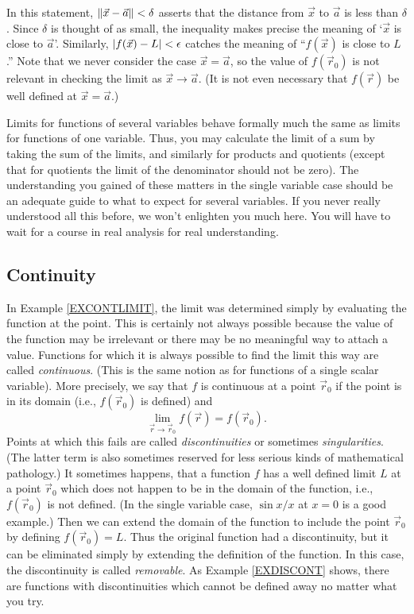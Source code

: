 In this statement, $\lVert\vec x - \vec a\rVert < \delta$ asserts that the distance
from $\vec x$ to $\vec a$ is less than $\delta$.  Since $\delta$ is
thought of as small, the inequality  makes precise the meaning of
`$\vec x$ is close to $\vec a$'.   Similarly, $\lvert f(\vec x) - L\rvert < 
\epsilon$ catches the meaning of ``$f(\vec x)$ is close to 
$L$.''  Note that we never consider the case $\vec x = \vec a$,
so the value of $f(\vec r_0)$
 is not relevant in checking the limit as $\vec x \to \vec a$.
(It is not even necessary that $f(\vec r)$  be well defined at
$\vec x = \vec a$.)

Limits for functions of several variables behave formally much
the same as limits for functions of one variable.  Thus, you
may calculate the limit of a sum by taking the sum of the
limits, and similarly for products and quotients (except that
for quotients the limit of the denominator should not be zero).
The understanding you gained of these matters in the single
variable case should be an adequate guide to what to expect
for several variables.  If you never really understood all this
before, we won't enlighten you much here.  You will have to
wait for a course in real analysis for real understanding.

\subsection{Continuity}
In Example \ref{EXCONTLIMIT}, the limit was determined simply by evaluating the
function at the point.  This is certainly not always possible
because the value of the function may be irrelevant or there
may be no 
meaningful 
way to 
attach a value.   Functions
for which it is always possible to find the limit this way
 are called
\emph{continuous}.  (This is the same notion as for functions
of a single scalar variable).  More precisely, we say that
$f$ is continuous at a point $\vec r_0$ if the point is in its domain (i.e.,
$f(\vec r_0)$ is defined) and
\[
  \lim_{\vec r \to \vec r_0} f(\vec r) = f(\vec r_0).
\]
Points at which this fails  are called \emph{discontinuities}
or sometimes \emph{singularities}.   (The latter term is also sometimes
reserved for less serious kinds of mathematical pathology.)  It
sometimes happens, that a function $f$ has a well defined limit $L$ at
a point $\vec r_0$ which does not happen to be in the domain of the function,
i.e., $f(\vec r_0)$ is not defined.  (In the single variable case,
$\sin x/ x$ at $x = 0$ is a good example.)  Then we can extend the
domain of the function to include the point $\vec r_0$ by defining
$f(\vec r_0) = L$.   Thus the original function had a discontinuity,
but it can be eliminated simply by extending the definition of the
function.  In this case, the discontinuity is called
\emph{removable}.   As Example \ref{EXDISCONT} shows, there are functions
with  discontinuities
which cannot be defined away no matter what you try.  
 
